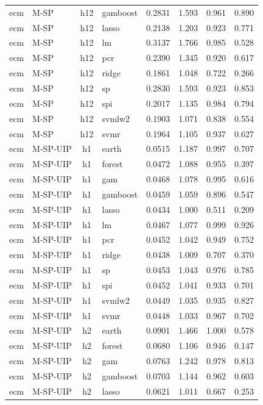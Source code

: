 \begin{ThreePartTable}
\begin{longtable}[t]{llclcccc}
ecm & M-SP & h12 & gamboost & 0.2831 & 1.593 & 0.961 & 0.890\\
ecm & M-SP & h12 & lasso & 0.2138 & 1.203 & 0.923 & 0.771\\
ecm & M-SP & h12 & lm & 0.3137 & 1.766 & 0.985 & 0.528\\
ecm & M-SP & h12 & pcr & 0.2390 & 1.345 & 0.920 & 0.617\\
ecm & M-SP & h12 & ridge & 0.1861 & 1.048 & 0.722 & 0.266\\
ecm & M-SP & h12 & sp & 0.2830 & 1.593 & 0.923 & 0.853\\
ecm & M-SP & h12 & spi & 0.2017 & 1.135 & 0.984 & 0.794\\
ecm & M-SP & h12 & svmlw2 & 0.1903 & 1.071 & 0.838 & 0.554\\
ecm & M-SP & h12 & svmr & 0.1964 & 1.105 & 0.937 & 0.627\\
\addlinespace
ecm & M-SP-UIP & h1 & earth & 0.0515 & 1.187 & 0.997 & 0.707\\
ecm & M-SP-UIP & h1 & forest & 0.0472 & 1.088 & 0.955 & 0.397\\
ecm & M-SP-UIP & h1 & gam & 0.0468 & 1.078 & 0.995 & 0.616\\
ecm & M-SP-UIP & h1 & gamboost & 0.0459 & 1.059 & 0.896 & 0.547\\
ecm & M-SP-UIP & h1 & lasso & 0.0434 & 1.000 & 0.511 & 0.209\\
ecm & M-SP-UIP & h1 & lm & 0.0467 & 1.077 & 0.999 & 0.926\\
ecm & M-SP-UIP & h1 & pcr & 0.0452 & 1.042 & 0.949 & 0.752\\
ecm & M-SP-UIP & h1 & ridge & 0.0438 & 1.009 & 0.707 & 0.370\\
ecm & M-SP-UIP & h1 & sp & 0.0453 & 1.043 & 0.976 & 0.785\\
ecm & M-SP-UIP & h1 & spi & 0.0452 & 1.041 & 0.933 & 0.701\\
ecm & M-SP-UIP & h1 & svmlw2 & 0.0449 & 1.035 & 0.935 & 0.827\\
ecm & M-SP-UIP & h1 & svmr & 0.0448 & 1.033 & 0.967 & 0.702\\
\addlinespace
ecm & M-SP-UIP & h2 & earth & 0.0901 & 1.466 & 1.000 & 0.578\\
ecm & M-SP-UIP & h2 & forest & 0.0680 & 1.106 & 0.946 & 0.147\\
ecm & M-SP-UIP & h2 & gam & 0.0763 & 1.242 & 0.978 & 0.813\\
ecm & M-SP-UIP & h2 & gamboost & 0.0703 & 1.144 & 0.962 & 0.603\\
ecm & M-SP-UIP & h2 & lasso & 0.0621 & 1.011 & 0.667 & 0.253\\

\end{longtable}
\end{ThreePartTable}

